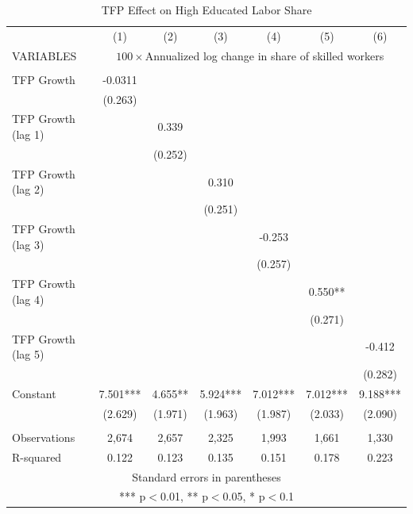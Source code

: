 \documentclass[12pt]{article}
\begin{document}
\begin{table}[h!]
\center
\scriptsize
\caption{TFP Effect on High Educated Labor Share}
\label{estimation1}
\begin{tabular}{lcccccc} \hline \hline
 & (1) & (2) & (3) & (4) & (5) & (6)\\
VARIABLES & \multicolumn{6}{c}{$100 \times$Annualized log change in share of skilled workers} \\ \hline
 &  &  &  &  &  &  \\
TFP Growth & -0.0311 &  &  &  &  &  \\
 & (0.263) &  &  &  &  &  \\
TFP Growth (lag 1) &  & 0.339 &  &  &  &  \\
 &  & (0.252) &  &  &  &  \\
TFP Growth (lag 2) &  &  & 0.310 &  &  &  \\
 &  &  & (0.251) &  &  &  \\
TFP Growth (lag 3) &  &  &  & -0.253 &  &  \\
 &  &  &  & (0.257) &  &  \\
TFP Growth (lag 4) &  &  &  &  & \color{red} 0.550** &  \\
 &  &  &  &  & \color{red} (0.271) &  \\
TFP Growth (lag 5) &  &  &  &  &  & -0.412 \\
 &  &  &  &  &  & (0.282) \\
Constant & 7.501*** & 4.655** & 5.924*** & 7.012*** & 7.012*** & 9.188*** \\
 & (2.629) & (1.971) & (1.963) & (1.987) & (2.033) & (2.090) \\
 &  &  &  &  &  &  \\
Observations & 2,674 & 2,657 & 2,325 & 1,993 & 1,661 & 1,330 \\
 R-squared & 0.122 & 0.123 & 0.135 & 0.151 & 0.178 & 0.223 \\ \hline
\multicolumn{7}{c}{ Standard errors in parentheses} \\
\multicolumn{7}{c}{ *** p$<$0.01, ** p$<$0.05, * p$<$0.1} \\
\end{tabular}
\end{table}
\end{document}
